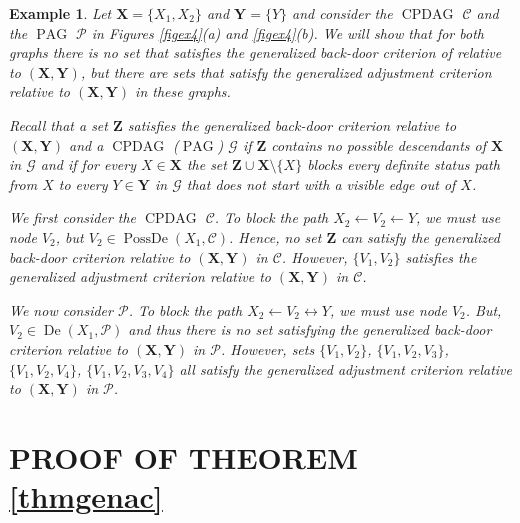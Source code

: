 \documentclass[]{article}
\DeclareMathOperator{\CPDAG}{CPDAG}
\DeclareMathOperator{\PAG}{PAG}
\DeclareMathOperator{\PossDe}{PossDe}
\DeclareMathOperator{\De}{De}
\newtheorem{example}[theorem]{Example}
\theoremstyle{definition}
\theoremstyle{remark}
\newcommand{\g}[1][G]{\mathcal{#1}}
\begin{document}
\begin{example}
 Let $\mathbf{X} = \{X_1,X_2\}$ and $\mathbf{Y} = \{Y\}$ and consider the $\CPDAG$ $\g[C]$ and the $\PAG$ $\g[P]$ in Figures \ref{figex4}(a) and \ref{figex4}(b). We will show that for both graphs there is no set that satisfies the generalized back-door criterion of  \cite{maathuis2013generalized} relative to $(\mathbf{X},\mathbf{Y})$, but there are sets that satisfy the generalized adjustment criterion relative to $(\mathbf{X},\mathbf{Y})$ in these graphs.
  
   Recall that a set $\mathbf{Z}$ satisfies the generalized back-door criterion relative to $(\mathbf{X},\mathbf{Y})$ and a $\CPDAG$ ($\PAG$) $\g$ if $\mathbf{Z}$ contains no possible descendants of $\mathbf{X}$ in $\g$ and if for every $X \in \mathbf{X}$ the set $\mathbf{Z}\cup \mathbf{X}\setminus\{X\}$ blocks every definite status path from $X$ to every $Y \in \mathbf{Y}$ in $\g$ that does not start with a visible edge out of $X$.

   We first consider the $\CPDAG$ $\g[C]$. 
   To block the path $X_2 \leftarrow V_2 \leftarrow Y$, we must use node $V_2$, but $V_2 \in \PossDe(X_1, \g[C])$. Hence, no set $\mathbf{Z}$ can satisfy the generalized back-door criterion relative to $(\mathbf{X},\mathbf{Y})$ in $\g[C]$. However, $\{ V_1,V_2\}$ satisfies the generalized adjustment criterion relative to $(\mathbf{X},\mathbf{Y})$ in $\g[C]$.

We now consider $\g[P]$. 
To block the path $X_2 \leftarrow V_2 \leftrightarrow Y$, we must use node $V_2$. But, $V_2 \in \De(X_1,\g[P])$ and thus there is no set satisfying the generalized back-door criterion relative to $(\mathbf{X},\mathbf{Y})$ in $\g[P]$. However, sets $\{ V_1,V_2\}$, $\{V_1,V_2,V_3\}$, $\{V_1,V_2,V_4\}$, $\{V_1,V_2,V_3,V_4\}$ all satisfy the generalized adjustment criterion relative to $(\mathbf{X},\mathbf{Y})$ in $\g[P]$. 
   \label{ex4}
\end{example}

\section{PROOF OF THEOREM \ref{thmgenac}}\label{sec: proof}
\end{document}
